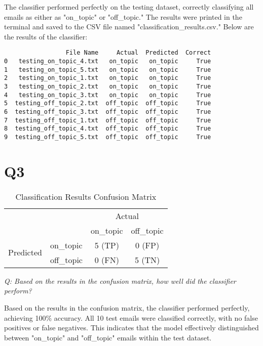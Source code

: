 \documentclass[12pt]{article}
\begin{document}
The classifier performed perfectly on the testing dataset, correctly classifying all emails as either as "on\_topic" or "off\_topic." The results were printed in the terminal and saved to the CSV file named "classification\_results.csv." Below are the results of the classifier:

\begin{verbatim}
                 File Name     Actual  Predicted  Correct
0   testing_on_topic_4.txt   on_topic   on_topic     True
1   testing_on_topic_5.txt   on_topic   on_topic     True
2   testing_on_topic_1.txt   on_topic   on_topic     True
3   testing_on_topic_2.txt   on_topic   on_topic     True
4   testing_on_topic_3.txt   on_topic   on_topic     True
5  testing_off_topic_2.txt  off_topic  off_topic     True
6  testing_off_topic_3.txt  off_topic  off_topic     True
7  testing_off_topic_1.txt  off_topic  off_topic     True
8  testing_off_topic_4.txt  off_topic  off_topic     True
9  testing_off_topic_5.txt  off_topic  off_topic     True
\end{verbatim}



\section*{Q3}

\begin{table}[h]
\centering
\caption{Classification Results Confusion Matrix}
\begin{tabular}{l|l|c|c|}
\multicolumn{2}{c}{}&\multicolumn{2}{c}{Actual}\\
\cline{3-4}
\multicolumn{2}{c|}{}&on\_topic&off\_topic\\
\cline{2-4}
\multirow{2}{*}{Predicted}& on\_topic & 5 (TP) & 0 (FP)\\
\cline{2-4}
& off\_topic & 0 (FN) & 5 (TN) \\
\cline{2-4}
\end{tabular}
\end{table}

\emph{Q: Based on the results in the confusion matrix, how well did the classifier perform?}

Based on the results in the confusion matrix, the classifier performed perfectly, achieving 100\% accuracy. All 10 test emails were classified correctly, with no false positives or false negatives. This indicates that the model effectively distinguished between "on\_topic" and "off\_topic" emails within the test dataset.
\end{document}
